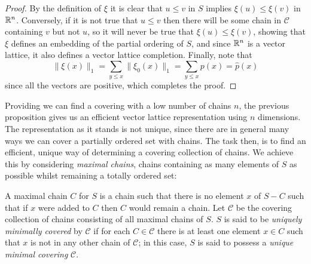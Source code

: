 \begin{proof}
By the definition of $\xi$ it is clear that $u \le v$ in $S$ implies $\xi(u) \le \xi (v)$ in $\mathbb{R}^n$. Conversely, if it is not true that $u \le v$ then there will be some chain in $\mathcal{C}$ containing $v$ but not $u$, so it will never be true that $\xi(u) \le \xi(v)$, showing that $\xi$ defines an embedding of the partial ordering of $S$, and since $\mathbb{R}^n$ is a vector lattice, it also defines a vector lattice completion. Finally, note that
$$\|\xi(x)\|_1 = \sum_{y\le x} \|\xi_0(x)\|_1 = \sum_{y \le x} p(x) = \hat{p}(x)$$
since all the vectors are positive, which completes the proof.
\end{proof}

Providing we can find a covering with a low number of chains $n$, the previous proposition gives us an efficient vector lattice representation using $n$ dimensions. The representation as it stands is not unique, since there are in general many ways we can cover a partially ordered set with chains. The task then, is to find an efficient, unique way of determining a covering collection of chains. We achieve this by considering \emph{maximal chains}, chains containing as many elements of $S$ as possible whilst remaining a totally ordered set:
\begin{defn}
A maximal chain $C$ for $S$ is a chain such that there is no element $x$ of $S - C$ such that if $x$ were added to $C$ then $C$ would remain a chain. Let $\mathcal{C}$ be the covering collection of chains consisting of all maximal chains of $S$. $S$ is said to be \emph{uniquely minimally covered} by $\mathcal{C}$ if for each $C \in \mathcal{C}$ there is at least one element $x \in C$ such that $x$ is not in any other chain of $\mathcal{C}$; in this case, $S$ is said to possess a \emph{unique minimal covering} $\mathcal{C}$.
\end{defn}

